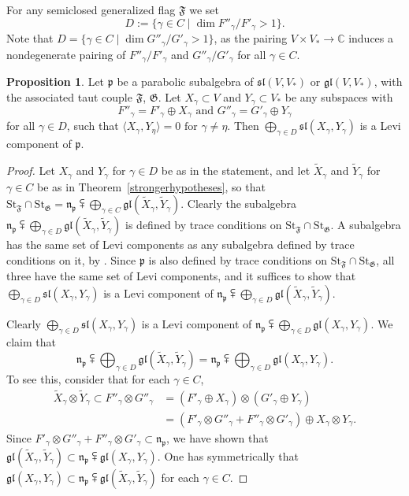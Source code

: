 \documentclass{amsart}
\theoremstyle{definition}
\newtheorem{prop}[theorem]{Proposition}
\theoremstyle{remark}
\numberwithin{equation}{section}
\newcommand {\C} {\mathbb{C}}
\newcommand {\St} {\mathrm{St}}
\def\gl{\mathfrak {gl}}
\def\n{\mathfrak {n}}
\def\p{\mathfrak {p}}
\def\sl{\mathfrak{sl}}
\def\F{\mathfrak{F}}
\def\G{\mathfrak{G}}
\begin{document}
For any semiclosed generalized flag $\F$ we set 
$$D := \{ \gamma \in C \mid \dim F''_\gamma / F'_\gamma > 1 \}.$$  
Note that $D = \{ \gamma \in C \mid \dim G''_\gamma / G'_\gamma > 1 \}$, as the pairing $V \times V_* \rightarrow \C$ induces a nondegenerate pairing of $F''_\gamma / F'_\gamma$ and $G''_\gamma / G'_\gamma$ for all $\gamma \in C$.


\begin{prop} \label{weakerhypotheses}
Let $\p$ be a parabolic subalgebra of $\sl(V,V_*)$ or $\gl(V,V_*)$, with the associated taut couple $\F$, $\G$. 
Let $X_\gamma \subset V$ and $Y_\gamma \subset V_*$ be any subspaces with $$F''_\gamma = F'_\gamma \oplus X_\gamma \textrm{ and } G''_\gamma = G'_\gamma \oplus Y_\gamma$$ for all $\gamma \in D$, such that
$\langle X_\gamma , Y_\eta \rangle = 0 \textrm{ for } \gamma \neq \eta.$
Then $\bigoplus_{\gamma \in D} \sl(X_\gamma, Y_\gamma)$ is a Levi component of $\p$.
\end{prop}

\begin{proof}
Let $X_\gamma$ and $Y_\gamma$ for $\gamma \in D$ be as in the statement, and let $\tilde{X}_\gamma$ and $\tilde{Y}_\gamma$ for $\gamma \in C$ be as in Theorem~\ref{strongerhypotheses}, so that $\St_\F \cap \St_\G = \n_\p \subsetplus \bigoplus_{\gamma \in C} \gl (\tilde{X}_\gamma , \tilde{Y}_\gamma)$.  Clearly the subalgebra $\n_\p \subsetplus \bigoplus_{\gamma \in D}  \gl (\tilde{X}_\gamma , \tilde{Y}_\gamma)$ is defined by trace conditions on $\St_\F \cap \St_\G$.  
A subalgebra has the same set of Levi components as any subalgebra defined by trace conditions on it, by \cite[Proposition 4.9]{DP}.  Since $\p$ is also defined by trace conditions on $\St_\F \cap \St_\G$, all three have the same set of Levi components, and it suffices to show that $\bigoplus_{\gamma \in D} \sl(X_\gamma, Y_\gamma)$ is a Levi component of  $\n_\p \subsetplus \bigoplus_{\gamma \in D}  \gl (\tilde{X}_\gamma , \tilde{Y}_\gamma)$.

Clearly $\bigoplus_{\gamma \in D} \sl(X_\gamma, Y_\gamma)$ is a Levi component of  $\n_\p \subsetplus \bigoplus_{\gamma \in D}  \gl (X_\gamma, Y_\gamma)$.  We claim that $$\n_\p \subsetplus \bigoplus_{\gamma \in D}  \gl (\tilde{X}_\gamma , \tilde{Y}_\gamma) = \n_\p \subsetplus \bigoplus_{\gamma \in D}  \gl (X_\gamma , Y_\gamma).$$
To see this, consider that for each $\gamma \in C$,
\begin{align*}
\tilde{X}_\gamma \otimes \tilde{Y}_\gamma \subset F''_\gamma \otimes G''_\gamma
& = (F'_\gamma \oplus X_\gamma) \otimes (G'_\gamma \oplus Y_\gamma) \\
& = (F'_\gamma \otimes G''_\gamma + F''_\gamma \otimes G'_\gamma) \oplus X_\gamma \otimes Y_\gamma.
\end{align*}
Since $F'_\gamma \otimes G''_\gamma + F''_\gamma \otimes G'_\gamma \subset \n_\p$, we have shown that
$\gl (\tilde{X}_\gamma , \tilde{Y}_\gamma) \subset \n_\p \subsetplus \gl (X_\gamma , Y_\gamma)$.  One has symmetrically that $\gl (X_\gamma , Y_\gamma) \subset \n_\p \subsetplus \gl (\tilde{X}_\gamma , \tilde{Y}_\gamma)$ for each $\gamma \in C$.
\end{proof}
\end{document}
